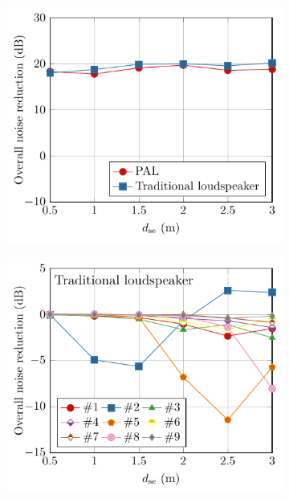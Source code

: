 \begin{figure}[!htb]
    \centering
    \begin{subfigure}{0.32\textwidth}
        \centering
        \includegraphics[width = \textwidth]{fig/ear_ANC_spectrum_ChangeSec.pdf}
        \caption{}
    \end{subfigure}
    \begin{subfigure}{0.32\textwidth}
        \centering
        \includegraphics[width = \textwidth]{fig/Genelec_ChangeSec_eval_TotalNR.pdf}

\end{subfigure}
\end{figure}
